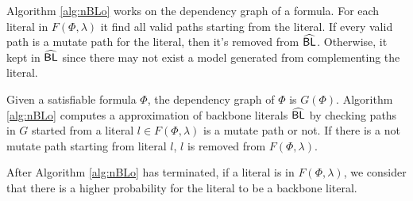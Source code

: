 Algorithm \ref{alg:nBLo} works on the dependency graph of a formula. For each literal in $F(\Phi, \lambda)$ it find all valid paths starting from the literal. If every valid path is a mutate path for the literal, then it's removed from ${\sf \widehat{BL}}$. Otherwise, it kept in ${\sf \widehat{BL}}$ since there may not exist a model generated from complementing the literal.

Given a satisfiable formula $\Phi$, the dependency graph of $\Phi$ is $G(\Phi)$. Algorithm \ref{alg:nBLo} computes a approximation of backbone literals ${\sf \widehat{BL}}$ by checking paths in $G$ started from a literal $l\in F(\Phi, \lambda)$ is a mutate path or not. If there is a not mutate path starting from literal $l$, $l$ is removed from $F(\Phi, \lambda)$.

After Algorithm \ref{alg:nBLo} has terminated, if a literal is in $F(\Phi, \lambda)$, we consider that there is a higher probability for the literal to be a backbone literal.
